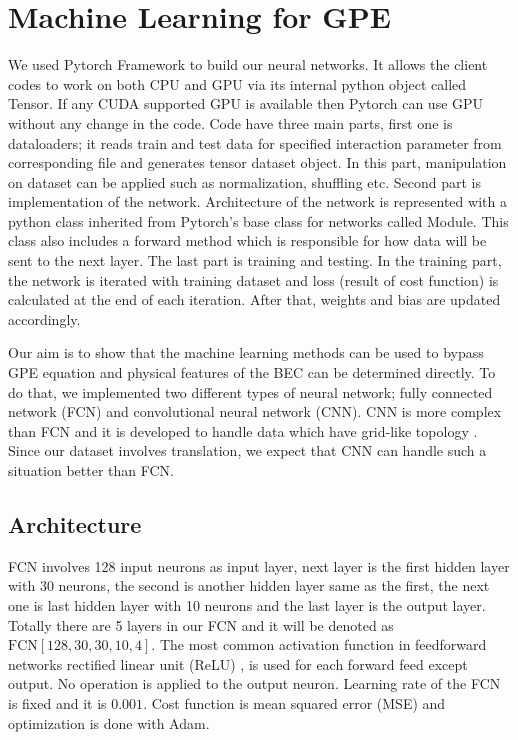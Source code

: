 \documentclass[a4paper,times,12pt]{article}
\begin{document}
\section{Machine Learning for GPE}

We used Pytorch Framework \cite{paszke2017automatic} to build our neural networks. It allows the client codes to work on both CPU and GPU via its internal python object called Tensor. If any CUDA supported GPU is available then Pytorch can use GPU without any change in the code. Code have three main parts, first one is dataloaders; it reads train and test data for specified interaction parameter from corresponding file and generates tensor dataset object. In this part, manipulation on dataset can be applied such as normalization, shuffling etc. Second part is implementation of the network. Architecture of the network is represented with a python class inherited from Pytorch's base class for networks called Module. This class also includes a forward method which is responsible for how data will be sent to the next layer. The last part is training and testing. In the training part, the network is iterated with training dataset and loss (result of cost function) is calculated at the end of each iteration. After that, weights and bias are updated accordingly. 

Our aim is to show that the machine learning methods can be used to bypass GPE equation and physical features of the BEC can be determined directly. To do that, we implemented two different types of neural network; fully connected network (FCN) and convolutional neural network (CNN). CNN is more complex than FCN and it is developed to handle data which have grid-like topology \cite{goodfellow2016deep}. Since our dataset involves translation, we expect that CNN can handle such a situation better than FCN.


\subsection{Architecture}

FCN involves 128 input neurons as input layer, next layer is the first hidden layer with 30 neurons, the second is another hidden layer same as the first, the next one is last hidden layer with 10 neurons and the last layer is the output layer. Totally there are 5 layers in our FCN and it will be denoted as $\mathrm{FCN}[128, 30, 30, 10, 4]$. The most common activation function in feedforward networks rectified linear unit (ReLU) \cite{mills2017deep}, is used for each forward feed except output. No operation is applied to the output neuron. Learning rate of the FCN is fixed and it is $0.001$. Cost function is mean squared error (MSE) and optimization is done with Adam. 
\end{document}
